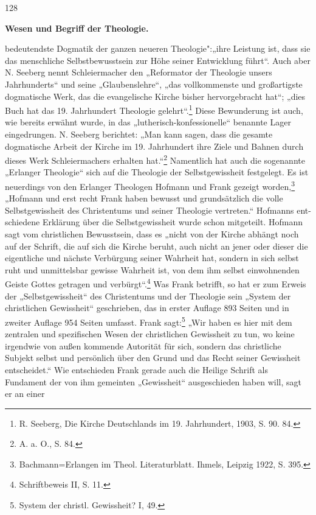 \mbox{}\hfill 128\n\par\n\centering \textbf{Wesen und Begriff der Theologie.}\n\par\nweitaus bedeutendste Dogmatik der ganzen neueren Theologie":\n„ihre Leistung ist, dass sie das menschliche Selbstbewusstsein zur Höhe seiner Entwicklung führt“. Auch aber N. Seeberg nennt Schleiermacher den „Reformator der Theologie unsers Jahrhunderts“ und seine „Glaubenslehre“, „das vollkommenste und großartigste dogmatische Werk, das die evangelische Kirche bisher hervorgebracht hat“; „dies Buch hat das 19. Jahrhundert Theologie gelehrt“.\footnote{R. Seeberg, Die Kirche Deutschlands im 19. Jahrhundert, 1903, S. 90. 84.} Diese Bewunderung ist auch, wie bereits erwähnt wurde, in das „lutherisch-konfessionelle“ benannte Lager eingedrungen. N. Seeberg berichtet: „Man kann sagen, dass die gesamte dogmatische Arbeit der Kirche im 19. Jahrhundert ihre Ziele und Bahnen durch dieses Werk Schleiermachers erhalten hat.“\footnote{A. a. O., S. 84.} Namentlich hat auch die sogenannte „Erlanger Theologie“ sich auf die Theologie der Selbstgewissheit festgelegt. Es ist neuerdings von den Erlanger Theologen Hofmann und Frank gezeigt worden,\footnote{Bachmann=Erlangen im Theol. Literaturblatt. Ihmels, Leipzig 1922, S. 395.} „Hofmann und erst recht Frank haben bewusst und grundsätzlich die volle Selbstgewissheit des Christentums und seiner Theologie vertreten.“ Hofmanns ent-schiedene Erklärung über die Selbstgewissheit wurde schon mitgeteilt. Hofmann sagt vom christlichen Bewusstsein, dass es „nicht von der Kirche abhängt noch auf der Schrift, die auf sich die Kirche beruht, auch nicht an jener oder dieser die eigentliche und nächste Verbürgung seiner Wahrheit hat, sondern in sich selbst ruht und unmittelsbar gewisse Wahrheit ist, von dem ihm selbst einwohnenden Geiste Gottes getragen und verbürgt“.\footnote{Schriftbeweis II, S. 11.} Was Frank betrifft, so hat er zum Erweis der „Selbstgewissheit“ des Christentums und der Theologie sein „System der christlichen Gewissheit“ geschrieben, das in erster Auflage 893 Seiten und in zweiter Auflage 954 Seiten umfasst. Frank sagt:\footnote{System der christl. Gewissheit? I, 49.} „Wir haben es hier mit dem zentralen und spezifischen Wesen der christlichen Gewissheit zu tun, wo keine irgendwie von außen kommende Autorität für sich, sondern das christliche Subjekt selbst und persönlich über den Grund und das Recht seiner Gewissheit entscheidet.“ Wie entschieden Frank gerade auch die Heilige Schrift als Fundament der von ihm gemeinten „Gewissheit“ ausgeschieden haben will, sagt er an einer